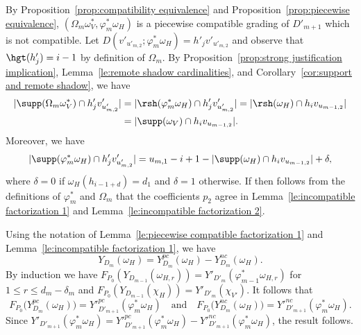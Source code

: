 \begin{enumerate}[label=(\alph*)]
 By Proposition~\ref{prop:compatibility equivalence} and Proposition~\ref{prop:piecewise equivalence}, $(\Omega_m\omega^*_V,\varphi^*_m\omega_H)$ is a piecewise compatible grading of $D'_{m+1}$ which is not compatible.
 Let $D(v'_{u'_{m,2}};\varphi^*_m\omega_H)=h'_jv'_{u'_{m,2}}$ and observe that $\hgt(h'_j)=i-1$ by definition of $\Omega_m$.
 By Proposition~\ref{prop:strong justification implication}, Lemma~\ref{le:remote shadow cardinalities}, and Corollary~\ref{cor:support and remote shadow}, we have
 \begin{align*}
 |\supp(\Omega_m\omega^*_V)\cap h'_jv'_{u'_{m,2}}|&=|\rsh(\varphi^*_m\omega_H)\cap h'_jv'_{u'_{m,2}}|=|\rsh(\omega_H)\cap h_iv_{u_{m-1,2}}|\\
 &=|\supp(\omega_V)\cap h_iv_{u_{m-1,2}}|.
 \end{align*}
 Moreover, we have
 \[|\supp(\varphi^*_m\omega_H)\cap h'_jv'_{u'_{m,2}}|=u_{m,1}-i+1-|\supp(\omega_H)\cap h_iv_{u_{m-1,2}}|+\delta,\]
 where $\delta=0$ if $\omega_H(h_{i-1+d})=d_1$ and $\delta=1$ otherwise.
 If then follows from the definitions of $\varphi^*_m$ and $\Omega_m$ that the coefficients $p_2$ agree in Lemma~\ref{le:incompatible factorization 1} and Lemma~\ref{le:incompatible factorization 2}.

 Using the notation of Lemma~\ref{le:piecewise compatible factorization 1} and Lemma~\ref{le:incompatible factorization 1}, we have 
 \[
 Y_{D_m}(\omega_H)=Y_{D_m}^{pc}(\omega_H)-Y_{D_m}^{nc}(\omega_H).
 \]
 By induction we have $F_{P_0}(Y_{D_{m-1}}(\omega_{H,r}))=Y'_{D'_m}(\varphi^*_{m-1}\omega_{H,r})$ for $1\le r\le d_m-\delta_m$ and $F_{P_0}(Y_{D_{m-1}}(\chi_H))=Y'_{D'_m}(\chi_{V'})$.
 It follows that 
 \[
 F_{P_0}\big(Y_{D_m}^{pc}(\omega_H)\big)={Y'}_{D'_{m+1}}^{pc}(\varphi^*_m\omega_H) 
 \quad\text{and} \quad F_{P_0}\big(Y_{D_m}^{nc}(\omega_H)\big)={Y'}_{D'_{m+1}}^{nc}(\varphi^*_m\omega_H).
 \]
 Since $Y'_{D'_{m+1}}(\varphi^*_m\omega_H)={Y'}_{D'_{m+1}}^{pc}(\varphi^*_m\omega_H)-{Y'}_{D'_{m+1}}^{nc}(\varphi^*_m\omega_H)$, the result follows.
\end{enumerate}
